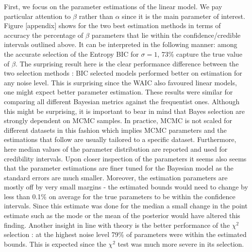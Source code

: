 \documentclass[12pt,]{article}
\begin{document}
First, we focus on the parameter estimations of the linear model. We pay particular attention to \(\beta\) rather than \(\alpha\) since it is the main parameter of interest. Figure {[}appendix{]} shows for the two best estimation methods in terms of accuracy the percentage of \(\beta\) parameters that lie within the confidence/credible intervals outlined above. It can be interpreted in the following manner: among the accurate selection of the Entropy BIC for \(\sigma = 1\), 73\% capture the true value of \(\beta\). The surprising result here is the clear performance difference between the two selection methods : BIC selected models performed better on estimation for any noise level. This is surprising since the WAIC also favoured linear models, one might expect better parameter estimation. These results were similar for comparing all different Bayesian metrics against the frequentist ones. Although this might be surprising, it is important to bear in mind that Bayes selection are strongly dependent on MCMC samples. In practice, MCMC is not scaled for different datasets in this fashion which implies MCMC parameters and the estimations that follow are usually tailored to a specific dataset. Furthermore, here median values of the parameter distribution are reported and used for credibility intervals. Upon closer inspection of the parameters it seems also seems that the parameter estimations are finer tuned for the Bayesian model as the standard errors are much smaller. Moreover, the estimation parameters are mostly off by very small margins - the estimated bounds would need to change by less than 0.1\% on average for the true parameters to be within the confidence intervals. Since this estimate was done for the median a small change in the point estimate such as the mode or the mean of the posterior would have altered this finding. Another insight in line with theory is the better performance of the \(\chi^2\) selection : at the highest noise level 79\% of parameters were within the estimated bounds. This is expected since the \(\chi^2\) test was much more severe in its selection.
\end{document}
